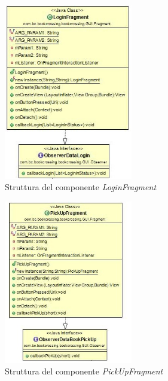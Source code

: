 \begin{figure}[h!]
	\includegraphics[width=0.5\textwidth]{Immagini/LoginFragment}
	\caption{Struttura del componente \textit{LoginFragment}}
	\label{fig:LoginFragment}
\end{figure}

\begin{figure}[h!]
	\includegraphics[width=0.5\textwidth]{Immagini/PickUpFragment}
	\caption{Struttura del componente \textit{PickUpFragment}}
	\label{fig:PickUpFragment}
\end{figure}

